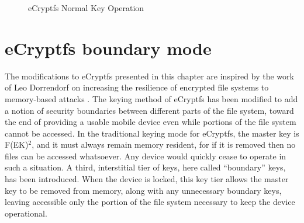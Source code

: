 \begin{figure}[!htb]
\begin{center}
 \end{center}
\caption{eCryptfs Normal Key Operation} \label{fig:ecryptfsnormal} \end{figure}

\section{eCryptfs boundary mode}
\label{sec:boundarymode}
The modifications to eCryptfs presented in this chapter are inspired by the work of Leo Dorrendorf on increasing the resilience of
encrypted file systems to memory-based attacks \citeyear{Dorrendorf2011}. The keying method of eCryptfs has been modified to add a
notion of security boundaries between different parts of the file system, toward the end of providing a usable mobile device even
while portions of the file system cannot be accessed. In the traditional keying mode for eCryptfs, the master key is
F(EK)$^{2}$, and it must always remain memory resident, for if it is removed then no files can be accessed whatsoever.
Any device would quickly cease to operate in such a situation. A third, interstitial tier of keys, here called ``boundary'' keys, has
been introduced. When the device is locked, this key tier allows the master key to be removed from memory, along with any unnecessary
boundary keys, leaving accessible only the portion of the file system necessary to keep the device operational.

